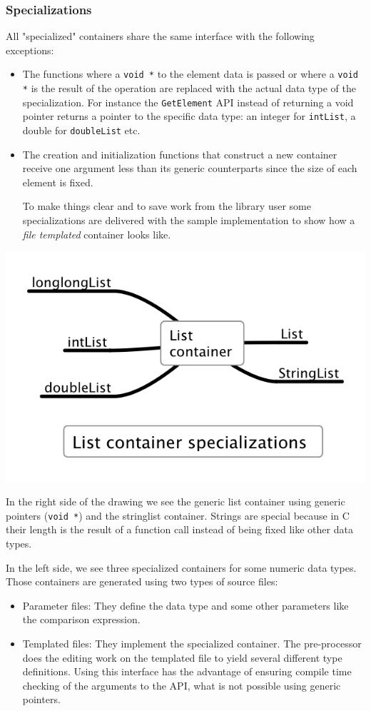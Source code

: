 \documentclass[12pt,a4paper]{memoir} %
\newif\iftth
\newenvironment{ShorterItemize}{
\begin{itemize}
\iftth\else
  \setlength{\itemsep}{1pt}
  \setlength{\parskip}{0pt}
  \setlength{\parsep}{0pt}
\fi
}{\end{itemize}
}
\begin{document}
\subsubsection{Specializations}
All "specialized" containers share the same interface with the following exceptions:
\begin{ShorterItemize}
\item The functions where a \verb,void *, to the element data is passed or where a \verb,void *, is the result of the operation are replaced with the 
actual data type of the specialization. For instance the \verb,GetElement, API instead of returning a void pointer returns a pointer to the specific 
data type: an 
integer for \verb,intList,, a double for \verb,doubleList, etc.
\item The creation and initialization functions that construct a new container receive one argument less than its generic counterparts since the
size of each element is fixed.

To make things clear and to save work from the library user some specializations are delivered with the sample implementation to show how a
\textsl{file templated} container looks like.
\end{ShorterItemize}
\begin{center}
\includegraphics[scale=0.625]{ListContainerSpecializations.png}
\end{center}
In the right side of the drawing we see the generic list container using generic pointers (\verb,void *,) and the stringlist container. Strings are 
special because in C their length is the result of a function call instead of being fixed like other data types.

In the left side, we see three specialized containers for some numeric data types. Those containers are generated using two types of source files:
\begin{ShorterItemize}
\item Parameter files: They define the data type and some other parameters like the comparison expression.
\item Templated files: They implement the specialized container. The pre-processor does the editing work on the templated file to yield several 
different type definitions. Using this interface has the advantage of ensuring compile time checking of the arguments to the API, what is not
possible using generic pointers.
\end{ShorterItemize}
\end{document}
